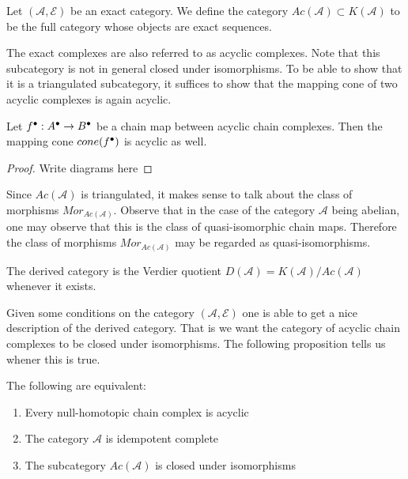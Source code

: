     \begin{definition}
        Let $(\mathcal{A},\mathcal{E})$ be an exact category. We define the category $Ac(\mathcal{A})\subset K(\mathcal{A})$ to be the full category whose objects are exact sequences.
    \end{definition}

    The exact complexes are also referred to as acyclic complexes. Note that this subcategory is not in general closed under isomorphisms. To be able to show that it is a triangulated subcategory, it suffices to show that the mapping cone of two acyclic complexes is again acyclic.

    \begin{lemma}
        Let $f^{\bullet}:A^{\bullet}\rightarrow B^{\bullet}$ be a chain map between acyclic chain complexes. Then the mapping cone $cone(f^{\bullet})$ is acyclic as well.
    \end{lemma}

    \begin{proof}
        Write diagrams here
    \end{proof}

    Since $Ac(\mathcal{A})$ is triangulated, it makes sense to talk about the class of morphisms $Mor_{Ac(\mathcal{A})}$. Observe that in the case of the category $\mathcal{A}$ being abelian, one may observe that this is the class of quasi-isomorphic chain maps. Therefore the class of morphisms $Mor_{Ac(\mathcal{A})}$ may be regarded as quasi-isomorphisms.

    \begin{definition}
        The derived category is the Verdier quotient $D(\mathcal{A})=K(\mathcal{A})/Ac(\mathcal{A})$ whenever it exists. 
    \end{definition}

     Given some conditions on the category $(\mathcal{A},\mathcal{E})$ one is able to get a nice description of the derived category. That is we want the category of acyclic chain complexes to be closed under isomorphisms. The following proposition tells us whener this is true.

    \begin{lemma}
        The following are equivalent:
        \begin{enumerate}
            \item Every null-homotopic chain complex is acyclic
            \item The category $\mathcal{A}$ is idempotent complete
            \item The subcategory $Ac(\mathcal{A})$ is closed under isomorphisms
        \end{enumerate}
    \end{lemma}

